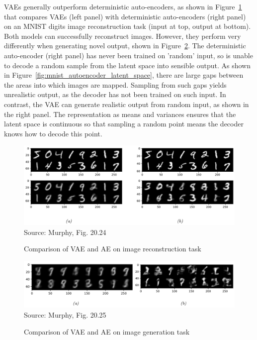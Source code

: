 VAEs generally outperform deterministic auto-encoders, as shown in Figure~\ref{fig:murphy_20_24} that compares VAEs (left panel) with deterministic auto-encoders (right panel) on an MNIST digits image reconstruction task (input at top, output at bottom). Both models can successfully reconstruct images. However, they perform very differently when generating novel output, shown in Figure~\ref{fig:murphy_20_25}. The deterministic auto-encoder (right panel) has never been trained on 'random' input, so is unable to decode a random sample from the latent space into sensible output. As shown in Figure~\ref{fig:mnist_autoencoder_latent_space}, there are large gaps between the areas into which images are mapped. Sampling from such gaps yields unrealistic output, as the decoder has not been trained on such input. In contrast, the VAE can generate realistic output from random input, as shown in the right panel. The representation as means and variances ensures that the latent space is continuous so that sampling a random point means the decoder knows how to decode this point. 

\begin{figure}
\begin{center}
\includegraphics[width=\textwidth]{murphy_20_24.png}\\

\scriptsize Source: Murphy, Fig. 20.24 \normalsize
\end{center}
\caption{Comparison of VAE and AE on image reconstruction task}
\label{fig:murphy_20_24}
\end{figure}

\begin{figure}
\begin{center}
\includegraphics[width=\textwidth]{murphy_20_25.png}\\

\scriptsize Source: Murphy, Fig. 20.25 \normalsize
\end{center}
\caption{Comparison of VAE and AE on image generation task}
\label{fig:murphy_20_25}
\end{figure}

